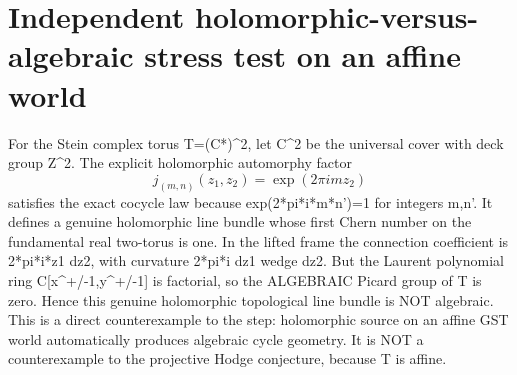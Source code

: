 \documentclass{article}
\begin{document}
\section{Independent holomorphic-versus-algebraic stress test on an affine world}
For the Stein complex torus T=(C*)^2, let C^2 be
the universal cover with deck group Z^2.
The explicit holomorphic automorphy factor
\[
j_{(m,n)}(z_1,z_2)=\exp(2\pi i m z_2)
\]
satisfies the exact cocycle law because
exp(2*pi*i*m*n')=1 for integers m,n'.
It defines a genuine holomorphic line bundle
whose first Chern number on the fundamental
real two-torus is one. In the lifted frame
the connection coefficient is 2*pi*i*z1 dz2,
with curvature 2*pi*i dz1 wedge dz2.
But the Laurent polynomial ring
C[x^{+/-1},y^{+/-1}] is factorial,
so the ALGEBRAIC Picard group of T is zero.
Hence this genuine holomorphic topological
line bundle is NOT algebraic.
This is a direct counterexample to the
step: holomorphic source on an affine GST world
automatically produces algebraic cycle geometry.
It is NOT a counterexample to the projective
Hodge conjecture, because T is affine.
\end{document}
